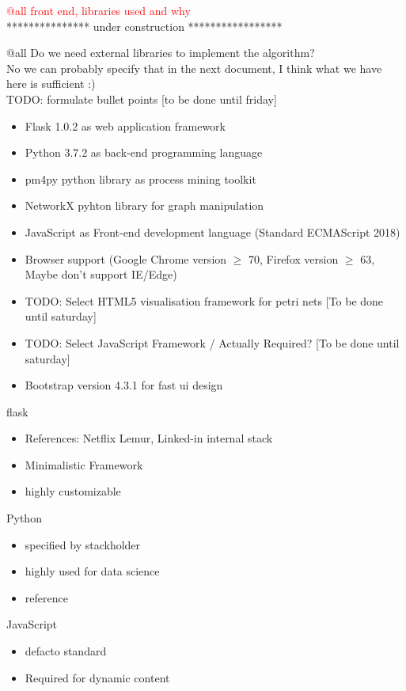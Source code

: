 \documentclass[notitlepage]{article}
\begin{document}
\begin{flushleft}
\textcolor{red}{@all front end, libraries used and why}\\

{\color{gray} *************** under construction *****************}

{\color{red} @all Do we need external libraries to implement the algorithm?}\\
{\color{blue} No we can probably specify that in the next document, I think what we have here is sufficient :)}\\
{\color{red} TODO: formulate bullet points [to be done until friday]}

\begin{itemize}
	\item Flask 1.0.2 as web application framework
	\item Python 3.7.2 as back-end programming language
	\item pm4py python library as process mining toolkit
    \item NetworkX pyhton library for graph manipulation
	\item JavaScript as Front-end development language (Standard ECMAScript 2018)
	\item Browser support (Google Chrome version $\geq$ 70, Firefox version $\geq$ 63, Maybe don't support IE/Edge)
	\item {\color{red} TODO: Select HTML5 visualisation framework for petri nets [To be done until saturday]}
	\item {\color{red} TODO: Select JavaScript Framework / Actually Required? [To be done until saturday]}
	\item Bootstrap version 4.3.1 for fast ui design
\end{itemize}

\large{flask}
\begin{itemize}
	\item References: Netflix Lemur, Linked-in internal stack
	\item Minimalistic Framework
	\item highly customizable
\end{itemize}

\large{Python}
\begin{itemize}
	\item specified by stackholder
	\item highly used for data science
	\item reference
\end{itemize}

\large{JavaScript}
\begin{itemize}
	\item defacto standard
	\item Required for dynamic content
\end{itemize}


\end{flushleft}
\end{document}
